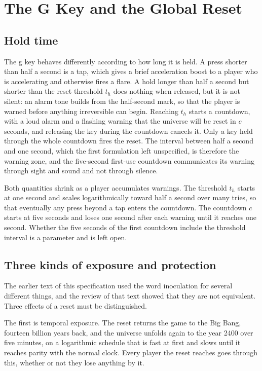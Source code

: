 \documentclass[11pt]{article}
\begin{document}
\section{The G Key and the Global Reset}
\label{sec:reset}

\subsection{Hold time}

The g key behaves differently according to how long it is held. A press shorter than half a second is a tap, which gives a brief acceleration boost to a player who is accelerating and otherwise fires a flare. A hold longer than half a second but shorter than the reset threshold $t_h$ does nothing when released, but it is not silent: an alarm tone builds from the half-second mark, so that the player is warned before anything irreversible can begin. Reaching $t_h$ starts a countdown, with a loud alarm and a flashing warning that the universe will be reset in $c$ seconds, and releasing the key during the countdown cancels it. Only a key held through the whole countdown fires the reset. The interval between half a second and one second, which the first formulation left unspecified, is therefore the warning zone, and the five-second first-use countdown communicates its warning through sight and sound and not through silence.

Both quantities shrink as a player accumulates warnings. The threshold $t_h$ starts at one second and scales logarithmically toward half a second over many tries, so that eventually any press beyond a tap enters the countdown. The countdown $c$ starts at five seconds and loses one second after each warning until it reaches one second. Whether the five seconds of the first countdown include the threshold interval is a parameter and is left open.

\subsection{Three kinds of exposure and protection}

The earlier text of this specification used the word inoculation for several different things, and the review of that text showed that they are not equivalent. Three effects of a reset must be distinguished.

The first is temporal exposure. The reset returns the game to the Big Bang, fourteen billion years back, and the universe unfolds again to the year 2400 over five minutes, on a logarithmic schedule that is fast at first and slows until it reaches parity with the normal clock. Every player the reset reaches goes through this, whether or not they lose anything by it.
\end{document}

